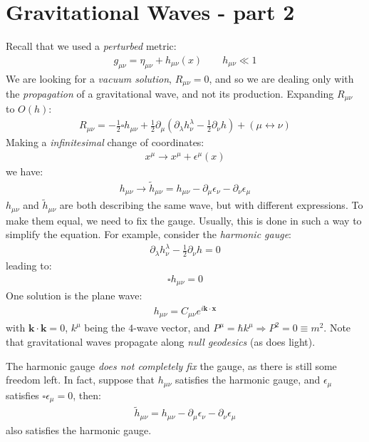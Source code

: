 \documentclass[../template.tex]{subfiles}
\begin{document}
\section{Gravitational Waves - part 2}

Recall that we used a \textit{perturbed} metric:
\begin{align*}
    g_{\mu \nu} = \eta_{\mu \nu} + h_{\mu \nu}(x) \qquad h_{\mu \nu} \ll 1
\end{align*}
We are looking for a \textit{vacuum solution}, $R_{\mu \nu} = 0$, and so we are dealing only with the \textit{propagation} of a gravitational wave, and not its production. Expanding $R_{\mu \nu}$ to $O(h)$:
\begin{align*}
    R_{\mu \nu} = - \frac{1}{2} \square h_{\mu \nu} + \frac{1}{2} \partial_\mu (\partial_\lambda h^\lambda_\nu - \frac{1}{2} \partial_\nu h ) + (\mu \leftrightarrow \nu)  
\end{align*}   
Making a \textit{infinitesimal} change of coordinates: 
\begin{align*}
    x^\mu \to x^\mu + \epsilon^\mu(x)
\end{align*}
we have:
\begin{align*}
    h_{\mu \nu} \to \tilde{h}_{\mu \nu} = h_{\mu \nu} - \partial_\mu \epsilon_\nu - \partial_\nu \epsilon_\mu
\end{align*}
$h_{\mu \nu}$ and $\tilde{h}_{\mu \nu}$ are both describing the same wave, but with different expressions. To make them equal, we need to fix the gauge. Usually, this is done in such a way to simplify the equation. For example, consider the \textit{harmonic gauge}:
\begin{align*}
    \partial_\lambda h^\lambda_\nu - \frac{1}{2} \partial_\nu h =0 
\end{align*} 
leading to:
\begin{align*}
    \square h_{\mu \nu} =0
\end{align*}
One solution is the plane wave:
\begin{align*}
    h_{\mu \nu} = C_{\mu \nu} e^{i \bm{k} \cdot \bm{x}}
\end{align*}
with $\bm{k}\cdot \bm{k} = 0$, $k^\mu$ being the $4$-wave vector, and $P^\mu = \hbar k^\mu \Rightarrow P^2 = 0 \equiv m^2$. Note that gravitational waves propagate along \textit{null geodesics} (as does light).

The harmonic gauge \textit{does not completely fix} the gauge, as there is still some freedom left. In fact, suppose that $h_{\mu \nu}$ satisfies the harmonic gauge, and $\epsilon_\mu$ satisfies $\square \epsilon_\mu = 0$, then:
\begin{align*}
    \tilde{h}_{\mu \nu} = h_{\mu \nu} - \partial_\mu \epsilon_\nu - \partial_\nu \epsilon_\mu
\end{align*} 
also satisfies the harmonic gauge.
\end{document}
